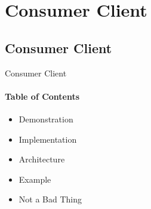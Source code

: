 \section{Consumer Client}
\author{Kasper}

\subsection{Consumer Client}
\begin{frame}{Consumer Client}
    \framesubtitle{Table of Contents}

    \begin{itemize}
        \item Demonstration
        \item Implementation
        \item Architecture
        \item Example
        \item Not a Bad Thing
    \end{itemize}
\end{frame}

